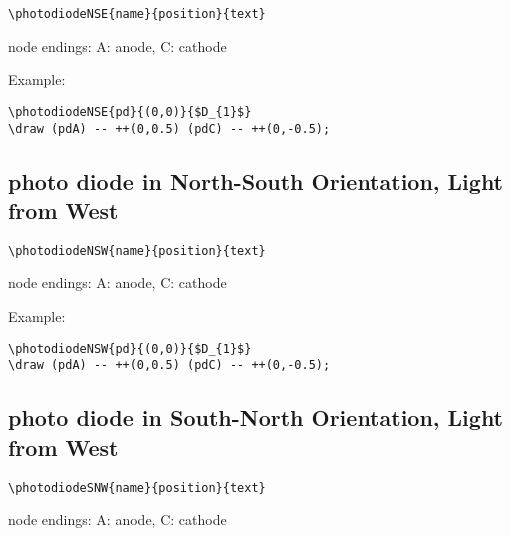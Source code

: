 \documentclass[parskip=full]{scrartcl}
\begin{document}
\begin{verbatim}
\photodiodeNSE{name}{position}{text}
\end{verbatim}
node endings: A: anode, C: cathode

Example:\\
\begin{minipage}{0.8\textwidth}
\begin{verbatim}
\photodiodeNSE{pd}{(0,0)}{$D_{1}$}
\draw (pdA) -- ++(0,0.5) (pdC) -- ++(0,-0.5);
\end{verbatim}
\end{minipage}
\begin{minipage}{0.19\textwidth}
\end{minipage}

\subsection{photo diode in North-South Orientation, Light from West}

\begin{verbatim}
\photodiodeNSW{name}{position}{text}
\end{verbatim}
node endings: A: anode, C: cathode

Example:\\
\begin{minipage}{0.8\textwidth}
\begin{verbatim}
\photodiodeNSW{pd}{(0,0)}{$D_{1}$}
\draw (pdA) -- ++(0,0.5) (pdC) -- ++(0,-0.5);
\end{verbatim}
\end{minipage}
\begin{minipage}{0.19\textwidth}
\end{minipage}

\subsection{photo diode in South-North Orientation, Light from West}

\begin{verbatim}
\photodiodeSNW{name}{position}{text}
\end{verbatim}
node endings: A: anode, C: cathode
\end{document}
